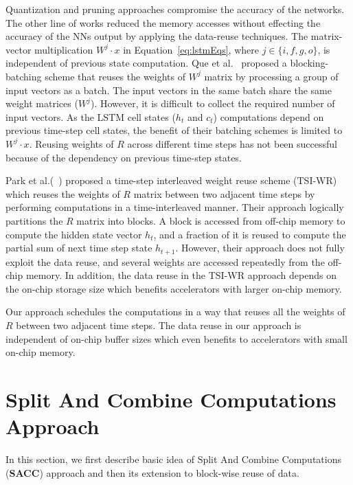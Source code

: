 Quantization and pruning approaches compromise the accuracy of the networks. The other line of works reduced the memory accesses without effecting the accuracy of the NNs output by applying the data-reuse techniques. The matrix-vector multiplication $W^j\cdot x$ in Equation~\eqref{eq:lstmEqs}, where $j\in \{i,f,g,o\}$, is independent of previous state computation. Que et al.~\cite{que2019efficient} proposed a blocking-batching scheme that reuses the weights of $W^j$ matrix by processing a group of input vectors as a batch. The input vectors in the same batch share the same weight matrices ($W^j$). However, it is difficult to collect the required number of input vectors. As the LSTM cell states ($h_t$ and $c_t$) computations depend on previous time-step cell states, the benefit of their batching schemes is limited to $W^j\cdot x$. Reusing weights of $R$ across different time steps has not been successful because of the dependency on previous time-step states.

Park et al.(~\cite{park2020time}) proposed a time-step interleaved weight reuse scheme (TSI-WR) which reuses the weights of $R$ matrix between two adjacent time steps by performing computations in a time-interleaved manner. Their approach logically partitions the $R$ matrix into blocks. A block is accessed from off-chip memory to compute the hidden state vector $h_t$, and a fraction of it is reused to compute the partial sum of next time step state $h_{t+1}$. However, their approach does not fully exploit the data reuse, and several weights are accessed repeatedly from the off-chip memory. In addition, the data reuse in the TSI-WR approach depends on the on-chip storage size which benefits accelerators with larger on-chip memory.

Our approach schedules the computations in a way that reuses all the weights of $R$ between two adjacent time steps. The data reuse in our approach is independent of on-chip buffer sizes which even benefits to accelerators with small on-chip memory. 

\section{Split And Combine Computations Approach}
In this section, we first describe basic idea of Split And Combine Computations (\textbf{SACC}) approach and then its extension to block-wise reuse of data.
